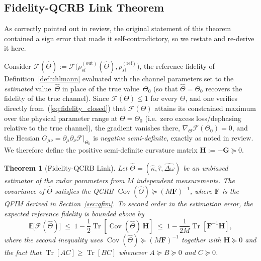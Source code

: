 \documentclass[journal]{IEEEtran}
\newtheorem{theorem}{Theorem}
\DeclareMathOperator{\Tr}{Tr}
\DeclareMathOperator{\Cov}{Cov}
\begin{document}
\subsection{Fidelity-QCRB Link Theorem}

As correctly pointed out in review, the original statement of this theorem contained a sign error that made it self-contradictory, so we restate and re-derive it here.

Consider $\mathcal F(\hat\Theta) := \mathcal F\big(\rho_{si}^{(\text{out})}(\hat\Theta), \rho_{si}^{(\text{ref})}\big)$, the reference fidelity of Definition~\ref{def:uhlmann} evaluated with the channel parameters set to the \emph{estimated} value~$\hat\Theta$ in place of the true value~$\Theta_0$ (so that $\hat\Theta=\Theta_0$ recovers the fidelity of the true channel). Since $\mathcal F(\Theta)\leq 1$ for every $\Theta$, and one verifies directly from~(\ref{eq:fidelity_closed}) that $\mathcal F(\Theta)$ attains its constrained maximum over the physical parameter range at $\Theta=\Theta_0$ (i.e.\ zero excess loss/dephasing relative to the true channel), the gradient vanishes there, $\nabla_\Theta\mathcal F(\Theta_0)=0$, and the Hessian $G_{\mu\nu}=\partial_\mu\partial_\nu\mathcal F|_{\Theta_0}$ is \emph{negative semi-definite}, exactly as noted in review. We therefore define the positive semi-definite curvature matrix $\mathbf H := -\mathbf G \succeq 0$.

\begin{theorem}[Fidelity-QCRB Link]\label{thm:fidelity_qcrb}
Let $\hat{\Theta} = (\hat{\kappa}, \hat{\tau}, \hat{\Delta\omega})$ be an unbiased estimator of the radar parameters from $M$ independent measurements. The covariance of $\hat{\Theta}$ satisfies the QCRB $\Cov(\hat{\Theta}) \succeq (M\mathbf{F})^{-1}$, where $\mathbf{F}$ is the QFIM derived in Section~\ref{sec:qfim}. To second order in the estimation error, the \emph{expected} reference fidelity is bounded \emph{above} by
\begin{equation}\label{eq:fidelity_qcrb}
\mathbb{E}\big[\mathcal{F}(\hat\Theta)\big] \;\leq\; 1 - \frac{1}{2}\Tr[\Cov(\hat{\Theta})\,\mathbf{H}] \;\leq\; 1 - \frac{1}{2M}\Tr[\mathbf{F}^{-1}\mathbf{H}],
\end{equation}
where the second inequality uses $\Cov(\hat\Theta)\succeq(M\mathbf F)^{-1}$ together with $\mathbf H\succeq0$ and the fact that $\Tr[AC]\geq\Tr[BC]$ whenever $A\succeq B\succeq0$ and $C\succeq0$.
\end{theorem}
\end{document}

